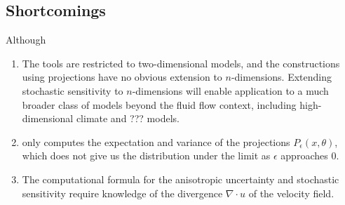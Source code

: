 \subsection{Shortcomings}
Although

\begin{enumerate}
	\item The tools are restricted to two-dimensional models, and the constructions using projections have no obvious extension to \(n\)-dimensions.
	      Extending stochastic sensitivity to \(n\)-dimensions will enable application to a much broader class of models beyond the fluid flow context, including high-dimensional climate and ??? models.

	\item \cite{Balasuriya_2020_StochasticSensitivityComputable} only computes the expectation and variance of the projections \(P_\epsilon(x,\theta)\), which does not give us the distribution under the limit as \(\epsilon\) approaches 0.

	\item The computational formula for the anisotropic uncertainty and stochastic sensitivity require knowledge of the divergence \(\nabla\cdot u\) of the velocity field.
\end{enumerate}



